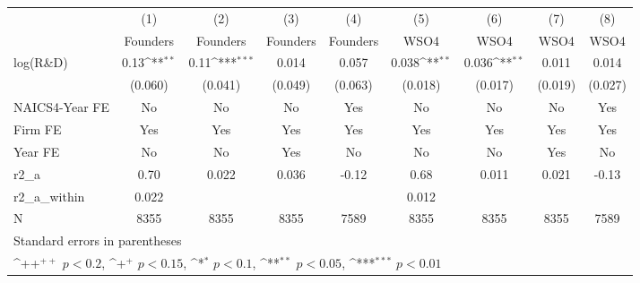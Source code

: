 {
\def\sym#1{\ifmmode^{#1}\else\(^{#1}\)\fi}
\begin{tabular}{l*{8}{c}}
\toprule
                    &\multicolumn{1}{c}{(1)}&\multicolumn{1}{c}{(2)}&\multicolumn{1}{c}{(3)}&\multicolumn{1}{c}{(4)}&\multicolumn{1}{c}{(5)}&\multicolumn{1}{c}{(6)}&\multicolumn{1}{c}{(7)}&\multicolumn{1}{c}{(8)}\\
                    &\multicolumn{1}{c}{Founders}&\multicolumn{1}{c}{Founders}&\multicolumn{1}{c}{Founders}&\multicolumn{1}{c}{Founders}&\multicolumn{1}{c}{WSO4}&\multicolumn{1}{c}{WSO4}&\multicolumn{1}{c}{WSO4}&\multicolumn{1}{c}{WSO4}\\
\midrule
log(R\&D)           &        0.13\sym{**} &        0.11\sym{***}&       0.014         &       0.057         &       0.038\sym{**} &       0.036\sym{**} &       0.011         &       0.014         \\
                    &     (0.060)         &     (0.041)         &     (0.049)         &     (0.063)         &     (0.018)         &     (0.017)         &     (0.019)         &     (0.027)         \\
\addlinespace
NAICS4-Year FE      &          No         &          No         &          No         &         Yes         &          No         &          No         &          No         &         Yes         \\
\addlinespace
Firm FE             &         Yes         &         Yes         &         Yes         &         Yes         &         Yes         &         Yes         &         Yes         &         Yes         \\
\addlinespace
Year FE             &          No         &          No         &         Yes         &          No         &          No         &          No         &         Yes         &          No         \\
\midrule
r2\_a                &        0.70         &       0.022         &       0.036         &       -0.12         &        0.68         &       0.011         &       0.021         &       -0.13         \\
r2\_a\_within         &       0.022         &                     &                     &                     &       0.012         &                     &                     &                     \\
N                   &        8355         &        8355         &        8355         &        7589         &        8355         &        8355         &        8355         &        7589         \\
\bottomrule
\multicolumn{9}{l}{\footnotesize Standard errors in parentheses}\\
\multicolumn{9}{l}{\footnotesize \sym{++} \(p<0.2\), \sym{+} \(p<0.15\), \sym{*} \(p<0.1\), \sym{**} \(p<0.05\), \sym{***} \(p<0.01\)}\\
\end{tabular}
}

